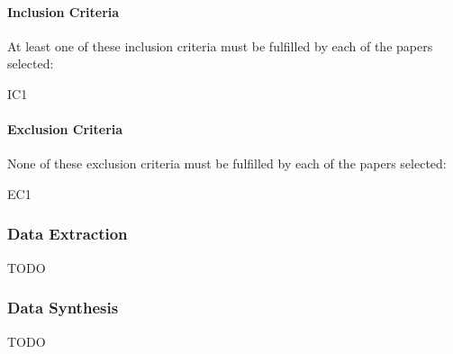 			\paragraph{Inclusion Criteria}
				At least one of these inclusion criteria must be fulfilled by each of the papers selected:
			
				\begin{aligneddescription}{IC1}
					\item[IC1] \icOne
					\item[IC2] \icTwo
					\item[IC3] \icThree
				\end{aligneddescription}
				
			\paragraph{Exclusion Criteria}
				None of these exclusion criteria must be fulfilled by each of the papers selected:
			
				\begin{aligneddescription}{EC1}
					\item[EC1] \ecOne
				\end{aligneddescription}
		
		\subsubsection{Data Extraction}
			TODO
		
		\subsubsection{Data Synthesis}
			TODO
